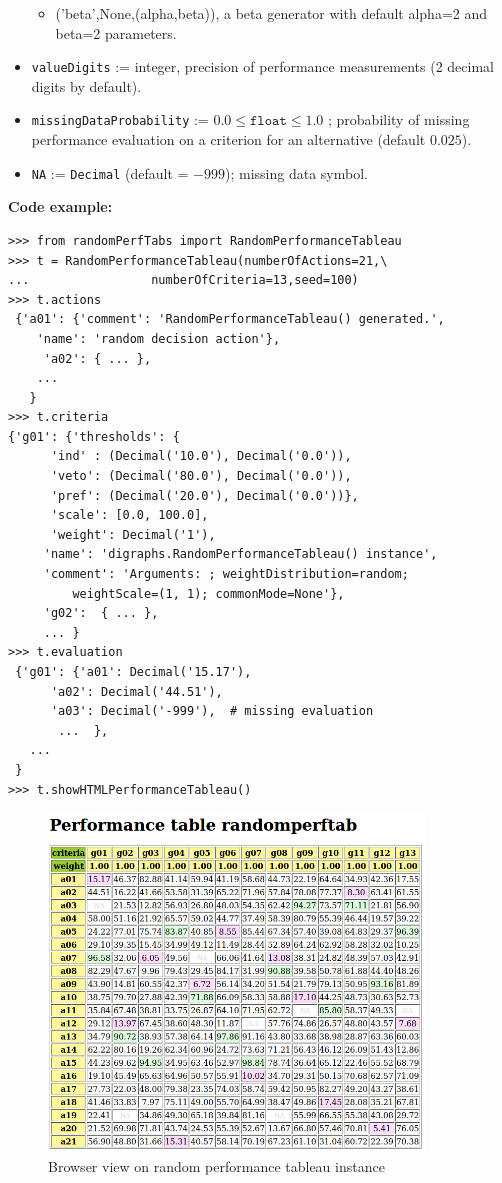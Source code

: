 \begin{itemize}
\begin{itemize}
         \item ('beta',None,(alpha,beta)), a beta generator with default alpha=2 and beta=2 parameters.
      \end{itemize}
\item \texttt{valueDigits} := integer, precision of performance measurements (2 decimal digits by default).
\item \texttt{missingDataProbability} := $0.0 \leq \mathtt{float} \leq 1.0$ ; probability of missing performance evaluation on a criterion for an alternative (default $0.025$).
\item \texttt{NA} := \texttt{Decimal} (default = $-999$); missing data symbol. 
\end{itemize} 

\noindent \textbf{Code example:}

\begin{lstlisting}[caption={Generating a random performance tableau},label=list:6.1,basicstyle=\footnotesize]
>>> from randomPerfTabs import RandomPerformanceTableau
>>> t = RandomPerformanceTableau(numberOfActions=21,\
...                 numberOfCriteria=13,seed=100)
>>> t.actions
 {'a01': {'comment': 'RandomPerformanceTableau() generated.',
	'name': 'random decision action'},
	 'a02': { ... },
    ...
   }
>>> t.criteria
{'g01': {'thresholds': {
      'ind' : (Decimal('10.0'), Decimal('0.0')),
      'veto': (Decimal('80.0'), Decimal('0.0')),
      'pref': (Decimal('20.0'), Decimal('0.0'))},
      'scale': [0.0, 100.0],
      'weight': Decimal('1'),
     'name': 'digraphs.RandomPerformanceTableau() instance',
     'comment': 'Arguments: ; weightDistribution=random;
         weightScale=(1, 1); commonMode=None'},
	 'g02':  { ... },
     ... }
>>> t.evaluation
 {'g01': {'a01': Decimal('15.17'),
      'a02': Decimal('44.51'),
      'a03': Decimal('-999'),  # missing evaluation
       ...  },
   ...
 }
>>> t.showHTMLPerformanceTableau()
 \end{lstlisting}

\begin{figure}[h]
\includegraphics[width=10cm]{Figures/randomPerfTab1.png}
\caption{Browser view on random performance tableau instance}
\label{fig:6.1}       %
\end{figure}

